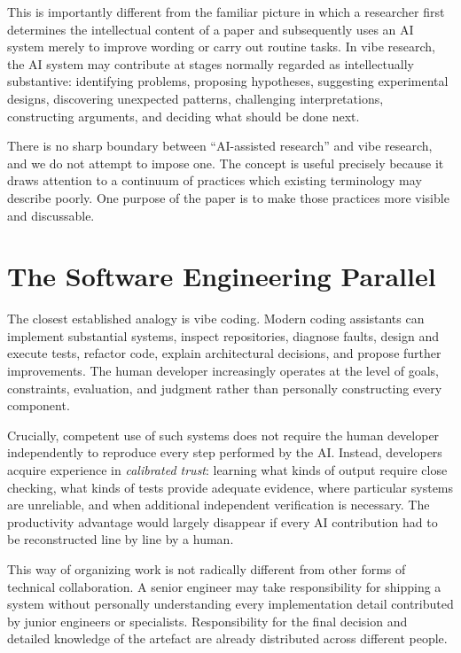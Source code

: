 This is importantly different from the familiar picture in which a researcher first determines the intellectual content of a paper and subsequently uses an AI system merely to improve wording or carry out routine tasks. In vibe research, the AI system may contribute at stages normally regarded as intellectually substantive: identifying problems, proposing hypotheses, suggesting experimental designs, discovering unexpected patterns, challenging interpretations, constructing arguments, and deciding what should be done next.

There is no sharp boundary between ``AI-assisted research'' and vibe research, and we do not attempt to impose one. The concept is useful precisely because it draws attention to a continuum of practices which existing terminology may describe poorly. One purpose of the paper is to make those practices more visible and discussable.


\section{The Software Engineering Parallel}

The closest established analogy is vibe coding. Modern coding assistants can implement substantial systems, inspect repositories, diagnose faults, design and execute tests, refactor code, explain architectural decisions, and propose further improvements. The human developer increasingly operates at the level of goals, constraints, evaluation, and judgment rather than personally constructing every component.

Crucially, competent use of such systems does not require the human developer independently to reproduce every step performed by the AI. Instead, developers acquire experience in \emph{calibrated trust}: learning what kinds of output require close checking, what kinds of tests provide adequate evidence, where particular systems are unreliable, and when additional independent verification is necessary. The productivity advantage would largely disappear if every AI contribution had to be reconstructed line by line by a human.

This way of organizing work is not radically different from other forms of technical collaboration. A senior engineer may take responsibility for shipping a system without personally understanding every implementation detail contributed by junior engineers or specialists. Responsibility for the final decision and detailed knowledge of the artefact are already distributed across different people.

